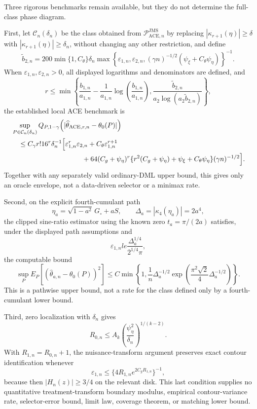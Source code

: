Three rigorous benchmarks remain available, but they do not determine the full-class phase diagram.

First, let \(\mathcal C_n(\delta_n)\) be the class obtained from \(\mathcal P_{\mathrm{ACE},n}^{\mathrm{JMS}}\) by replacing \(|\kappa_{r+1}(\eta)|\ge\delta\) with \(|\kappa_{r+1}(\eta)|\ge\delta_n\), without changing any other restriction, and define
\[
 \widetilde b_{2,n}
 =200\min\{1,C_{\theta}\}\delta_n
 \max\!\left\{
   \varepsilon_{1,n},\varepsilon_{2,n},
   (\gamma n)^{-1/2}(\psi_{\xi}+C_{\theta}\psi_{\eta})
 \right\}^{-1}.
\]
When \(\varepsilon_{1,n},\varepsilon_{2,n}>0\), all displayed logarithms and denominators are defined, and
\[
 r\le
 \min\!\left\{
   \frac{b_{1,n}}{a_{1,n}}
   -\frac{1}{a_{1,n}}\log\!\left(\frac{b_{1,n}}{a_{1,n}}\right),
   \frac{\widetilde b_{2,n}}{a_2\log(a_2\widetilde b_{2,n})}
 \right\},
\]
the established local ACE benchmark is
\[
\begin{aligned}
 &\sup_{P\in\mathcal C_n(\delta_n)}
 Q_{P,1-\gamma}
 \!\left(|\widehat\theta_{\mathrm{ACE},r,n}-\theta_0(P)|\right)\\
 &\quad\le
 C_{\gamma}r!16^r\delta_n^{-1}
 \Bigl[
   \varepsilon_{1,n}^r\varepsilon_{2,n}
   +C_{\theta}\varepsilon_{1,n}^{r+1}\\
 &\hspace{36mm}
   +64(C_g+\psi_{\eta})^r
    \{r^2(C_g+\psi_{\eta})+\psi_{\xi}+C_{\theta}\psi_{\eta}\}
    (\gamma n)^{-1/2}
 \Bigr].
\end{aligned}
\]
Together with any separately valid ordinary-DML upper bound, this gives only an oracle envelope, not a data-driven selector or a minimax rate.

Second, on the explicit fourth-cumulant path
\[
 \eta_a=\sqrt{1-a^2}\,G_{\circ}+aS,
 \qquad
 \Delta_a=|\kappa_4(\eta_a)|=2a^4,
\]
the clipped sine-ratio estimator using the known zero \(t_a=\pi/(2a)\) satisfies, under the displayed path assumptions and
\[
 \varepsilon_{1,n}le\frac{\Delta_a^{1/4}}{2^{1/4}\pi},
\]
the computable bound
\[
 \sup_P E_P[(\widehat\theta_{a,n}-\theta_0(P))^2]
 \le
 C\min\!\left\{
  1,\frac{1}{n}\Delta_a^{-1/2}
  \exp\!\left(\frac{\pi^2\sqrt2}{4}\Delta_a^{-1/2}\right)
 \right\}.
\]
This is a pathwise upper bound, not a rate for the class defined only by a fourth-cumulant lower bound.

Third, zero localization with \(\delta_n\) gives
\[
 R_{0,n}\le A_k
 \left(\frac{\psi_{\eta}^2}{\delta_n}\right)^{1/(k-2)}.
\]
With \(R_{1,n}=R_{0,n}+1\), the nuisance-transform argument preserves exact contour identification whenever
\[
 \varepsilon_{1,n}
 \le\{4R_{1,n}e^{2C_gR_{1,n}}\}^{-1},
\]
because then \(|H_n(z)|\ge3/4\) on the relevant disk. This last condition supplies no quantitative treatment-transform boundary modulus, empirical contour-variance rate, selector-error bound, limit law, coverage theorem, or matching lower bound.